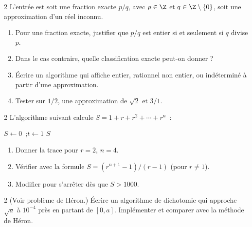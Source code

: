 \begin{exo}{2}
L'entr\'ee est soit une fraction exacte $p/q$, avec $p\in\Z$ et
$q\in\Z\setminus\{0\}$, soit une approximation d'un r\'eel inconnu.
\begin{enumerate}
  \item Pour une fraction exacte, justifier que $p/q$ est entier si et seulement si $q$ divise $p$.
  \item Dans le cas contraire, quelle classification exacte peut-on donner ?
  \item \'Ecrire un algorithme qui affiche \og entier\fg, \og rationnel non entier\fg,
        ou \og ind\'etermin\'e \`a partir d'une approximation\fg.
  \item Tester sur $1/2$, une approximation de $\sqrt2$ et $3/1$.
\end{enumerate}
\end{exo}

\begin{exo}{2}
L'algorithme suivant calcule $S = 1 + r + r^2 + \cdots + r^n$~:

\begin{algorithm}[H]
\caption{Somme g\'eom\'etrique}
$S \leftarrow 0$~;\quad $t \leftarrow 1$\;
\Afficher $S$\;
\end{algorithm}

\begin{enumerate}
  \item Donner la trace pour $r=2$, $n=4$.
  \item V\'erifier avec la formule $S = (r^{n+1}-1)/(r-1)$ (pour $r\ne1$).
  \item Modifier pour s'arr\^eter d\`es que $S>1000$.
\end{enumerate}
\end{exo}

\begin{exo}{2}
(Voir probl\`eme de H\'eron.) \'Ecrire un algorithme de dichotomie
qui approche $\sqrt{a}$ \`a $10^{-4}$ pr\`es en partant de $[0, a]$.
Impl\'ementer et comparer avec la m\'ethode de H\'eron.
\end{exo}

